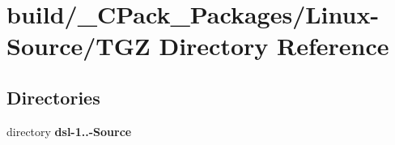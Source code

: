 \section{build/\-\_\-\-C\-Pack\-\_\-\-Packages/\-Linux-\/\-Source/\-T\-G\-Z Directory Reference}
\label{dir_6317be17056abaf0c8accca7de5e8d77}
\subsection*{Directories}
\begin{DoxyCompactItemize}
\item 
directory {\bf dsl-\/1..-\/\-Source}
\end{DoxyCompactItemize}
